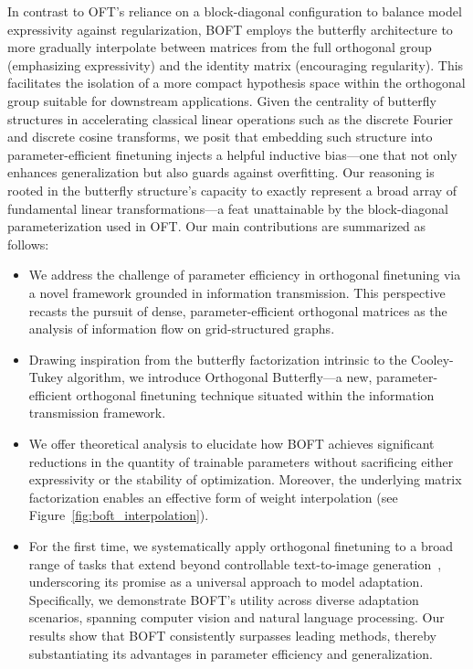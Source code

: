 In contrast to OFT’s reliance on a block-diagonal configuration to balance model expressivity against regularization, BOFT employs the butterfly architecture to more gradually interpolate between matrices from the full orthogonal group (emphasizing expressivity) and the identity matrix (encouraging regularity). This facilitates the isolation of a more compact hypothesis space within the orthogonal group suitable for downstream applications. Given the centrality of butterfly structures in accelerating classical linear operations such as the discrete Fourier and discrete cosine transforms, we posit that embedding such structure into parameter-efficient finetuning injects a helpful inductive bias—one that not only enhances generalization but also guards against overfitting. Our reasoning is rooted in the butterfly structure’s capacity to exactly represent a broad array of fundamental linear transformations—a feat unattainable by the block-diagonal parameterization used in OFT. Our main contributions are summarized as follows:

\begin{itemize}[leftmargin=*,nosep]
    \item We address the challenge of parameter efficiency in orthogonal finetuning via a novel framework grounded in information transmission. This perspective recasts the pursuit of dense, parameter-efficient orthogonal matrices as the analysis of information flow on grid-structured graphs.
    \item Drawing inspiration from the butterfly factorization intrinsic to the Cooley-Tukey algorithm, we introduce Orthogonal Butterfly—a new, parameter-efficient orthogonal finetuning technique situated within the information transmission framework.
    \item We offer theoretical analysis to elucidate how BOFT achieves significant reductions in the quantity of trainable parameters without sacrificing either expressivity or the stability of optimization. Moreover, the underlying matrix factorization enables an effective form of weight interpolation (see Figure~\ref{fig:boft_interpolation}).
    \item For the first time, we systematically apply orthogonal finetuning to a broad range of tasks that extend beyond controllable text-to-image generation~\cite{qiu2023controlling}, underscoring its promise as a universal approach to model adaptation. Specifically, we demonstrate BOFT’s utility across diverse adaptation scenarios, spanning computer vision and natural language processing. Our results show that BOFT consistently surpasses leading methods, thereby substantiating its advantages in parameter efficiency and generalization.
\end{itemize}

